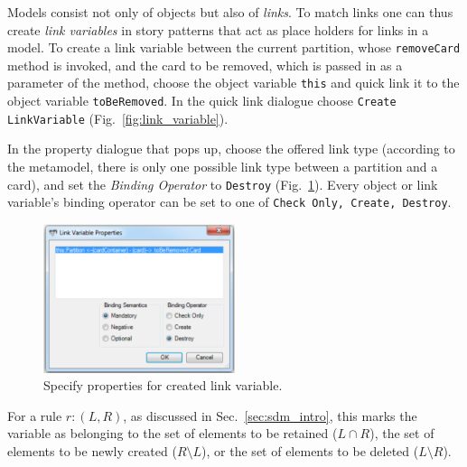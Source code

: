 Models consist not only of objects but also of \emph{links}.  To match links one
can thus create \emph{link variables} in story patterns that act as place
holders for links in a model.  To create a link variable between the current
partition, whose \texttt{removeCard} method is invoked, and the card
to be removed, which is passed in as a parameter of the method, choose
the object variable \texttt{this} and quick link it to the object variable
\texttt{toBeRemoved}.  In the quick link dialogue choose \texttt{Create
LinkVariable} (Fig.~\ref{fig:link_variable}).

In the property dialogue that pops up, choose the offered link type (according
to the metamodel, there is only one possible link type between a partition and a
card), and set the \emph{Binding Operator} to \texttt{Destroy}
(Fig.~\ref{fig:link_variable_properties}). Every object or link variable's
binding operator can be set to one of \texttt{Check Only, Create,
Destroy}.

\begin{figure}[htp] 
\begin{center}
  \includegraphics[width=0.5\textwidth]{pics/sdmBilder/removeCard/sdm12RAW}
  \caption{Specify properties for created link variable.}  
  \label{fig:link_variable_properties}
\end{center}
\end{figure}



For a rule $r: (L, R)$, as discussed in Sec.~\ref{sec:sdm_intro}, this marks the
variable as belonging to the set of elements to be retained ($L\cap R$), the set
of elements to be newly created ($R\setminus L$), or the set of elements to be
deleted ($L\setminus R$).
 
